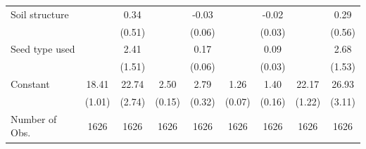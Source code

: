 {\begin{tabular}{l*{8}{c}}
Soil structure  &                  &     0.34         &                  &    -0.03         &                  &    -0.02         &                  &     0.29         \\
                &                  &   (0.51)         &                  &   (0.06)         &                  &   (0.03)         &                  &   (0.56)         \\
Seed type used  &                  &     2.41         &                  &     0.17\sym{***}&                  &     0.09\sym{***}&                  &     2.68\sym{*}  \\
                &                  &   (1.51)         &                  &   (0.06)         &                  &   (0.03)         &                  &   (1.53)         \\
Constant        &    18.41\sym{***}&    22.74\sym{***}&     2.50\sym{***}&     2.79\sym{***}&     1.26\sym{***}&     1.40\sym{***}&    22.17\sym{***}&    26.93\sym{***}\\
                &   (1.01)         &   (2.74)         &   (0.15)         &   (0.32)         &   (0.07)         &   (0.16)         &   (1.22)         &   (3.11)         \\
\hline
Number of Obs.  &     1626         &     1626         &     1626         &     1626         &     1626         &     1626         &     1626         &     1626         \\
\hline\hline
\end{tabular}
}

